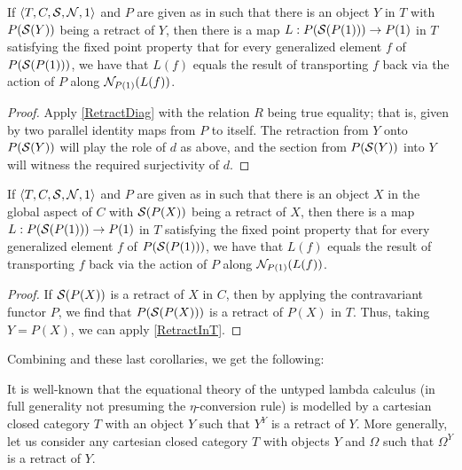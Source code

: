 \begin{corollary}\label{RetractInT}
If $\langle T, C, \mathcal{S}, \mathcal{N}, 1 \rangle$ and $P$ are given as in  such that there is an object $Y$ in $T$ with $P(\mathcal{S}(Y))$ being a retract of $Y$, then there is a map $L : P(\mathcal{S}(P(1))) \to P(1)$ in $T$ satisfying the fixed point property that for every generalized element $f$ of $P(\mathcal{S}(P(1)))$, we have that $L(f)$ equals the result of transporting $f$ back via the action of $P$ along $\mathcal{N}_{P(1)}(L(f))$.
\end{corollary}
\begin{proof}
Apply \cref{RetractDiag} with the relation $R$ being true equality; that is, given by two parallel identity maps from $P$ to itself. The retraction from $Y$ onto $P(\mathcal{S}(Y))$ will play the role of $d$ as above, and the section from $P(\mathcal{S}(Y))$ into $Y$ will witness the required surjectivity of $d$.
\end{proof}

\begin{corollary}\label{RetractInC}
If $\langle T, C, \mathcal{S}, \mathcal{N}, 1 \rangle$ and $P$ are given as in  such that there is an object $X$ in the global aspect of $C$ with $\mathcal{S}(P(X))$ being a retract of $X$, then there is a map $L : P(\mathcal{S}(P(1))) \to P(1)$ in $T$ satisfying the fixed point property that for every generalized element $f$ of $P(\mathcal{S}(P(1)))$, we have that $L(f)$ equals the result of transporting $f$ back via the action of $P$ along $\mathcal{N}_{P(1)}(L(f))$.
\end{corollary}
\begin{proof}
If $\mathcal{S}(P(X))$ is a retract of $X$ in $C$, then by applying the contravariant functor $P$, we find that $P(\mathcal{S}(P(X)))$ is a retract of $P(X)$ in $T$. Thus, taking $Y = P(X)$, we can apply \cref{RetractInT}.
\end{proof}

Combining  and these last corollaries, we get the following:

\label{YCombinator}
It is well-known that the equational theory of the untyped lambda calculus (in full generality not presuming the $\eta$-conversion rule) is modelled by a cartesian closed category $T$ with an object $Y$ such that $Y^Y$ is a retract of $Y$. More generally, let us consider any cartesian closed category $T$ with objects $Y$ and $\Omega$ such that $\Omega^Y$ is a retract of $Y$.

